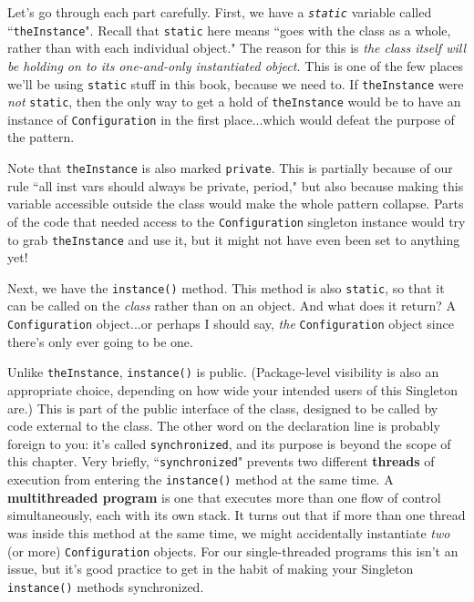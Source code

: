 Let's go through each part carefully. First, we have a
\textit{\texttt{static}} variable called ``\texttt{theInstance}". Recall that
\texttt{static} here means ``goes with the class as a whole, rather than with
each individual object." The reason for this is \textit{the class itself will
be holding on to its one-and-only instantiated object.} This is one of the few
places we'll be using \texttt{static} stuff in this book, because we need to.
If \texttt{theInstance} were \textit{not} \texttt{static}, then the only way
to get a hold of \texttt{theInstance} would be to have an instance of
\texttt{Configuration} in the first place...which would defeat the purpose of
the pattern.

Note that \texttt{theInstance} is also marked \texttt{private}. This is
partially because of our rule ``all inst vars should always be private,
period," but also because making this variable accessible outside the class
would make the whole pattern collapse. Parts of the code that needed access to
the \texttt{Configuration} singleton instance would try to grab
\texttt{theInstance} and use it, but it might not have even been set to
anything yet!

Next, we have the \texttt{instance()} method. This method is also
\texttt{static}, so that it can be called on the \textit{class} rather than on
an object. And what does it return? A \texttt{Configuration} object...or
perhaps I should say, \textit{the} \texttt{Configuration} object since there's
only ever going to be one.

Unlike \texttt{theInstance}, \texttt{instance()} is public. (Package-level
visibility is also an appropriate choice, depending on how wide your intended
users of this Singleton are.) This is part of the public interface of the
class, designed to be called by code external to the class. The other word on
the declaration line is probably foreign to you: it's called
\texttt{synchronized}, and its purpose is beyond the scope of this chapter.
Very briefly, ``\texttt{synchronized}" prevents two different \textbf{threads}
of execution from entering the \texttt{instance()} method at the same time.
A \textbf{multithreaded program} is one that executes more than one flow of
control simultaneously, each with its own stack. It turns out that if more
than one thread was inside this method at the same time, we might accidentally
instantiate \textit{two} (or more) \texttt{Configuration} objects. For our
single-threaded programs this isn't an issue, but it's good practice to get in
the habit of making your Singleton \texttt{instance()} methods synchronized.

